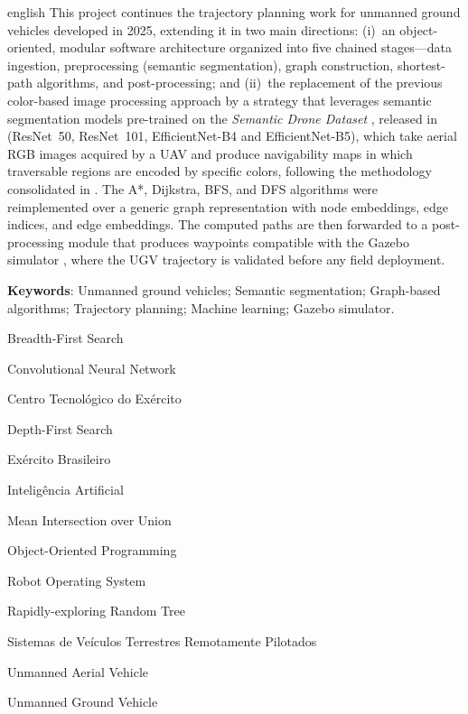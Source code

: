 \documentclass[
    12pt,
    openright,
    oneside,
    a4paper,
    english,
    brazil
]{abntex2}
\begin{document}
\begin{resumo}[Abstract]
\begin{otherlanguage*}{english}
This project continues the trajectory planning work for unmanned ground vehicles developed in 2025, extending it in two main directions: (i)~an object-oriented, modular software architecture organized into five chained stages---data ingestion, preprocessing (semantic segmentation), graph construction, shortest-path algorithms, and post-processing; and (ii)~the replacement of the previous color-based image processing approach by a strategy that leverages semantic segmentation models pre-trained on the \emph{Semantic Drone Dataset} \cite{drone_dataset}, released in \cite{junior2024_models} (ResNet~50, ResNet~101, EfficientNet-B4 and EfficientNet-B5), which take aerial RGB images acquired by a UAV and produce navigability maps in which traversable regions are encoded by specific colors, following the methodology consolidated in \cite{junior2025_rrt}. The A*, Dijkstra, BFS, and DFS algorithms were reimplemented over a generic graph representation with node embeddings, edge indices, and edge embeddings. The computed paths are then forwarded to a post-processing module that produces waypoints compatible with the Gazebo simulator \cite{koenig2004}, where the UGV trajectory is validated before any field deployment.

\textbf{Keywords}: Unmanned ground vehicles; Semantic segmentation; Graph-based algorithms; Trajectory planning; Machine learning; Gazebo simulator.
\end{otherlanguage*}
\end{resumo}

\listoffigures*
\cleardoublepage

\listoftables*
\cleardoublepage

\begin{siglas}
    \item[BFS] Breadth-First Search
    \item[CNN] Convolutional Neural Network
    \item[CTEx] Centro Tecnológico do Exército
    \item[DFS] Depth-First Search
    \item[EB] Exército Brasileiro
    \item[IA] Inteligência Artificial
    \item[mIoU] Mean Intersection over Union
    \item[OOP] Object-Oriented Programming
    \item[ROS] Robot Operating System
    \item[RRT] Rapidly-exploring Random Tree
    \item[SVTRP] Sistemas de Veículos Terrestres Remotamente Pilotados
    \item[UAV] Unmanned Aerial Vehicle
    \item[UGV] Unmanned Ground Vehicle
\end{siglas}
\end{document}
